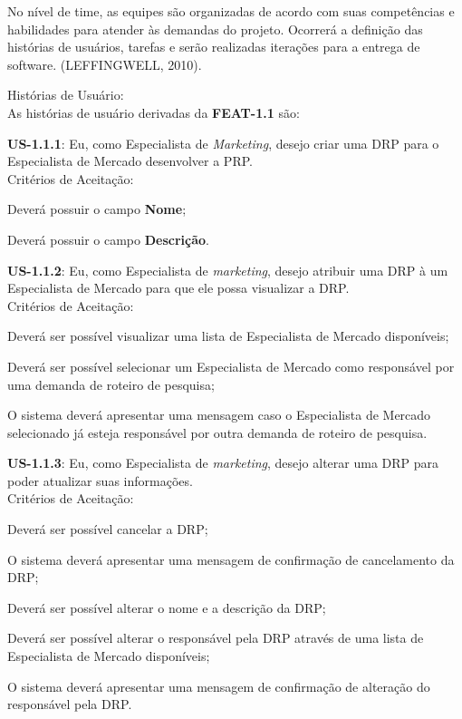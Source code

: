 			No nível de time, as equipes são organizadas de acordo com suas competências e habilidades para atender às demandas do projeto. Ocorrerá a definição das histórias de usuários, tarefas e serão realizadas iterações para a entrega de software. (LEFFINGWELL, 2010).

			\begin{itemize}
			{
				\item Histórias de Usuário:\\
				As histórias de usuário derivadas da \textbf{FEAT-1.1} são:
				\begin{itemize}
				{
					\item \textbf{US-1.1.1}: Eu, como Especialista de \textit{Marketing}, desejo criar uma DRP para o Especialista de Mercado desenvolver a PRP.\\
					Critérios de Aceitação:
						\begin{enumerate}
						{
							\item Deverá possuir o campo \textbf{Nome};
							\item Deverá possuir o campo \textbf{Descrição}.
						}
						\end{enumerate}

					\item \textbf{US-1.1.2}: Eu, como Especialista de \textit{marketing}, desejo atribuir uma DRP à um Especialista de Mercado para que ele possa visualizar a DRP.\\
					Critérios de Aceitação:
						\begin{enumerate}
						{
							\item Deverá ser possível visualizar uma lista de Especialista de Mercado disponíveis;
							\item Deverá ser possível selecionar um Especialista de Mercado como responsável por uma demanda de roteiro de pesquisa;
							\item O sistema deverá apresentar uma mensagem caso o Especialista de Mercado selecionado já esteja responsável por outra demanda de roteiro de pesquisa.
						}
						\end{enumerate}

					\item \textbf{US-1.1.3}: Eu, como Especialista de \textit{marketing}, desejo alterar uma DRP para poder atualizar suas informações.\\
					Critérios de Aceitação:
						\begin{enumerate}
						{
							\item Deverá ser possível cancelar a DRP;
							\item O sistema deverá apresentar uma mensagem de confirmação de cancelamento da DRP;
							\item Deverá ser possível alterar o nome e a descrição da DRP;
							\item Deverá ser possível alterar o responsável pela DRP através de uma lista de Especialista de Mercado disponíveis;
							\item O sistema deverá apresentar uma mensagem de confirmação de alteração do responsável pela DRP.\\
						}
						\end{enumerate}

}
\end{itemize}}
\end{itemize}
